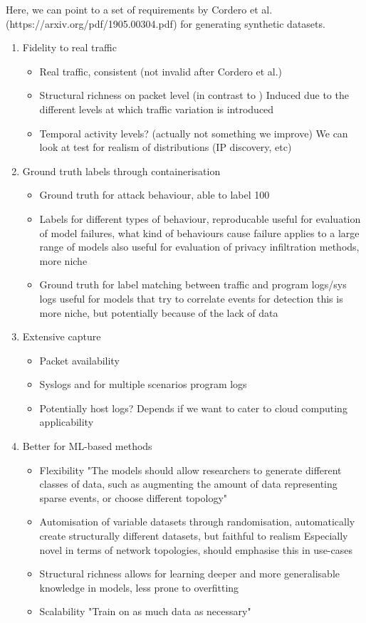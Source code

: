\documentclass{article}
\begin{document}
Here, we can point to a set of requirements by Cordero et al. (https://arxiv.org/pdf/1905.00304.pdf) for generating synthetic datasets.
\begin{enumerate}
\item Fidelity to real traffic
\begin{itemize}
	\item Real traffic, consistent (not invalid after Cordero et al.)
	\item Structural richness on packet level (in contrast to )
		Induced due to the different levels at which traffic variation is introduced
	\item Temporal activity levels? (actually not something we improve)
			We can look at test for realism of distributions (IP discovery, etc)
\end{itemize}
\item Ground truth labels through containerisation
\begin{itemize}
	\item Ground truth for attack behaviour, able to label 100%
	\item Labels for different types of behaviour, reproducable
		useful for evaluation of model failures, what kind of behaviours cause failure
			applies to a large range of models
		also useful for evaluation of privacy infiltration methods, more niche
	\item Ground truth for label matching between traffic and program logs/sys logs
		useful for models that try to correlate events for detection
			this is more niche, but potentially because of the lack of data
\end{itemize}
\item Extensive capture
\begin{itemize}
	\item Packet availability
	\item Syslogs and for multiple scenarios program logs
	\item Potentially host logs? Depends if we want to cater to cloud computing applicability
\end{itemize}
\item Better for ML-based methods
\begin{itemize}
	\item Flexibility 
		"The models should allow researchers to generate different classes of data, such as augmenting the amount of data representing sparse events, or choose different topology"
	\item Automisation of variable datasets through randomisation, automatically create structurally different datasets, but faithful to realism
		Especially novel in terms of network topologies, should emphasise this in use-cases
	\item Structural richness 
			allows for learning deeper and more generalisable knowledge in models, less prone to overfitting
	\item Scalability
		"Train on as much data as necessary"
\end{itemize}

\end{enumerate}
\end{document}
